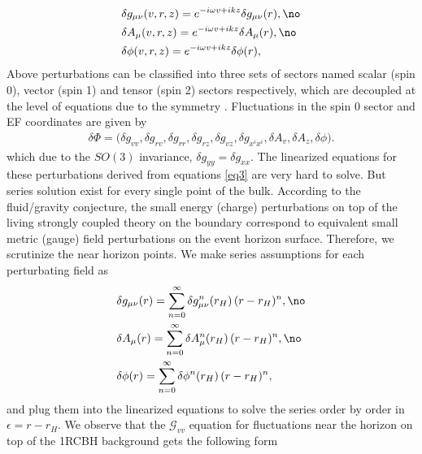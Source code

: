 \documentclass[preprintnumbers,aps,prd,longbibliography,nofootinbib,nobibnotes,amsmath,amssymb]{revtex4}
\begin{document}
\begin{align}\label{setfluc}
	&\delta g_{\mu \nu}(v, r, z) = e^{- i \omega v + i k z} \delta g_{\mu \nu}(r), \no\\
	&\delta A_{\mu }(v, r, z) = e^{- i \omega v + i k z} \delta A_{\mu }(r),\no\\
	&\delta \phi(v, r, z) = e^{- i \omega v + i k z} \delta \phi(r),
\end{align}
Above perturbations can be classified  into three sets of sectors named scalar (spin 0), vector (spin 1) and tensor (spin 2) sectors respectively, which are decoupled at the level of equations due to the symmetry \cite{Jansen:2019wag}. Fluctuations in the spin 0 sector and EF coordinates are given by
\begin{align}
\delta \Phi = \bigg(\delta g_{v v}, \delta g_{r v}, \delta g_{rr}, \delta g_{r z}, \delta g_{v z}, \delta g_{x^{i}x^{i}}, \delta A_{v}, \delta A_{z}, \delta \phi \bigg).
\end{align}
which due to the $SO(3)$ invariance,  $\delta g_{y y} = \delta g_{x x}$. The linearized equations for these perturbations  derived from equations \eqref{eq3} are very hard to solve. But  series solution exist for every single point of the bulk.  According to the fluid/gravity conjecture, the small energy (charge) perturbations on top of the living strongly coupled theory on the boundary  correspond to equivalent small metric (gauge) field perturbations on the event horizon surface. Therefore, we scrutinize the near horizon points. We  make  series assumptions for each perturbating field as
	\begin{align}\label{expansion}
	&\delta g_{\mu \nu}(r) = \sum_{n = 0}^{\infty} \delta g_{\mu \nu}^{n}(r_H)\, (r -r_H)^n,\no\\
	&\delta A_{\mu}(r) = \sum_{n = 0}^{\infty} \delta A_{\mu}^{n}(r_H)\, (r -r_H)^n,\no\\
	&\delta \phi(r) = \sum_{n = 0}^{\infty} \delta\phi^{n}(r_H)\, (r -r_H)^n,
	\end{align}
	and plug them into the linearized equations to solve the  series order by order in $\epsilon = r -r_H$.  We observe that  the $\mathcal{G}_{v v}$ equation for fluctuations near the horizon on top of the 1RCBH background gets the following form
\end{document}

